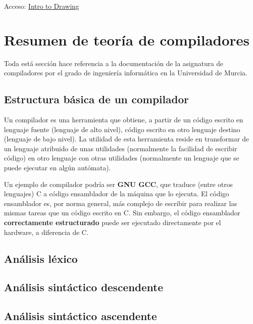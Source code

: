 \documentclass{report}
\begin{document}
	\vspace{10px}
	
	Acceso: 
	\href{https://es.khanacademy.org/computing/hour-of-code/hour-of-code-tutorial/p/intro-to-drawing}{Intro to Drawing}
	
	\section{Resumen de teoría de compiladores}
	
	Toda está sección hace referencia a la documentación de la asignatura de compiladores por el grado de ingeniería informática en la Universidad de Murcia.
	
	\subsection{Estructura básica de un compilador}
	
	Un compilador es una herramienta que obtiene, a partir de un código escrito en lenguaje fuente (lenguaje de alto nivel), código escrito en otro lenguaje destino (lenguaje de bajo nivel). La utilidad de esta herramienta reside en transformar de un lenguaje atribuido de unas utilidades (normalmente la facilidad de escribir código) en otro lenguaje con otras utilidades (normalmente un lenguaje que se puede ejecutar en algún autómata). 
	
	\vspace{10px}
	
	Un ejemplo de compilador podría ser \textbf{GNU GCC}, que traduce (entre otros lenguajes) C a código ensamblador de la máquina que lo ejecuta. El código ensamblador es, por norma general, más complejo de escribir para realizar las mismas tareas que un código escrito en C. Sin embargo, el código ensamblador \textbf{correctamente estructurado} puede ser ejecutado directamente por el hardware, a diferencia de C.
		
	\subsection{Análisis léxico}
	
	\subsection{Análisis sintáctico descendente}
	
	\subsection{Análisis sintáctico ascendente}
	
\end{document}
